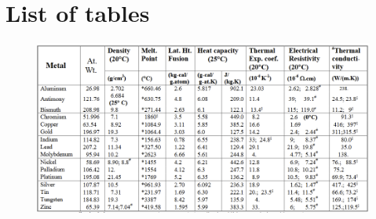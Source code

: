 \documentclass[final]{cubedoc}
\begin{document}
	
	
	
	
	
	
	\section{List of tables}\label{list_tables}
	
	
	
	\begin{figure}[h!]
		\centering
		\includegraphics[width=\linewidth]{docs/mist_heat_capacity.png}
		\caption{\cite[p.37]{solder}}
		\label{fig:metal_table_1}
	\end{figure}
	
\end{document}
